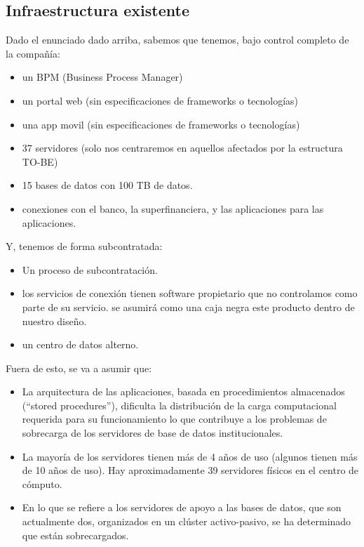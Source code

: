 \documentclass[a4paper]{article}
\begin{document}
\subsection{Infraestructura existente}
Dado el enunciado dado arriba, sabemos que tenemos, bajo control completo de la compañía:
\begin{itemize}
    \item un BPM (Business Process Manager)
    \item un portal web (sin especificaciones de frameworks o tecnologías)
    \item una app movil (sin especificaciones de frameworks o tecnologías)
    \item 37 servidores (solo nos centraremos en aquellos afectados por la estructura TO-BE)
    \item 15 bases de datos con 100 TB de datos.
    \item conexiones con el banco, la superfinanciera, y las aplicaciones para las aplicaciones.
\end{itemize}

Y, tenemos de forma subcontratada:

\begin{itemize}
    \item Un proceso de subcontratación.
    \item los servicios de conexión tienen software propietario que no controlamos como parte de su servicio. 
    se asumirá como una caja negra este producto dentro de nuestro diseño.
    \item un centro de datos alterno. 
\end{itemize}

Fuera de esto, se va a asumir que:

\begin{itemize}
    \item La arquitectura de las aplicaciones, basada en procedimientos almacenados (“stored procedures”), dificulta la
    distribución de la carga computacional requerida para su funcionamiento lo que contribuye a los problemas de
    sobrecarga de los servidores de base de datos institucionales.
    \item La mayoría de los servidores tienen más de 4 años de uso (algunos tienen más de 10 años de uso). Hay
    aproximadamente 39 servidores físicos en el centro de cómputo.
    \item En lo que se refiere a los servidores de apoyo a las bases de datos, que son actualmente dos, organizados en
    un clúster activo-pasivo, se ha determinado que están sobrecargados.
\end{itemize}
\end{document}
